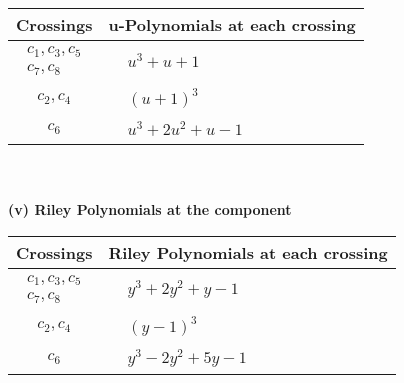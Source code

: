 \documentclass[1p]{elsarticle_modified}
\theoremstyle{definition}
\begin{document}
\begin{tabular}{m{50pt}|m{274pt}}
Crossings & \hspace{64pt}u-Polynomials at each crossing \\
\hline $$\begin{aligned}c_{1},c_{3},c_{5}\\c_{7},c_{8}\end{aligned}$$&$\begin{aligned}
&u^3+u+1
\end{aligned}$\\
\hline $$\begin{aligned}c_{2},c_{4}\end{aligned}$$&$\begin{aligned}
&(u+1)^3
\end{aligned}$\\
\hline $$\begin{aligned}c_{6}\end{aligned}$$&$\begin{aligned}
&u^3+2 u^2+u-1
\end{aligned}$\\
\hline
\end{tabular}\\~\\
\newpage\renewcommand{\arraystretch}{1}
\flushleft \textbf{(v) Riley Polynomials at the component}\newline \\
\begin{tabular}{m{50pt}|m{274pt}}
Crossings & \hspace{64pt}Riley Polynomials at each crossing \\
\hline $$\begin{aligned}c_{1},c_{3},c_{5}\\c_{7},c_{8}\end{aligned}$$&$\begin{aligned}
&y^3+2 y^2+y-1
\end{aligned}$\\
\hline $$\begin{aligned}c_{2},c_{4}\end{aligned}$$&$\begin{aligned}
&(y-1)^3
\end{aligned}$\\
\hline $$\begin{aligned}c_{6}\end{aligned}$$&$\begin{aligned}
&y^3-2 y^2+5 y-1
\end{aligned}$\\
\hline
\end{tabular}\\~\\
\end{document}
